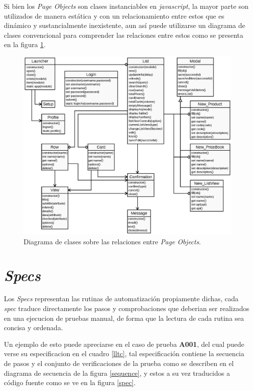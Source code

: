Si bien los \emph{Page Objects} son clases instanciables en \emph{javascript},
la mayor parte son utilizados de manera estática y con un relacionamiento
entre estos que es dinámico y sustancialmente inexistente, aun así puede
utilizarse un diagrama de clases convencional para comprender las relaciones
entre estos como se presenta en la figura \ref{pom}.

\begin{figure}
\centering
\includegraphics[width=1.0\textwidth]{graphics/diagram01.eps}
\caption{Diagrama de clases sobre las relaciones entre \emph{Page Objects}.}
\label{pom}
\end{figure}

\section{\emph{Specs}}
Los \emph{Specs} representan las rutinas de automatización propiamente dichas,
cada \emph{spec} traduce directamente los pasos y comprobaciones que deberian
ser realizados en una ejecucion de pruebas manual, de forma que la lectura de
cada rutina sea concisa y ordenada.

Un ejemplo de esto puede apreciarse en el caso de prueba \textbf{A001}, del cual
puede verse su especificacion en el cuadro \ref{lltc}, tal especificación
contiene la secuencia de pasos y el conjunto de verificaciones de la prueba como
se describen en el diagrama de secuencia de la figura \ref{sequence}, y estos a
su vez traducidos a código fuente como se ve en la figura \ref{spec}.

